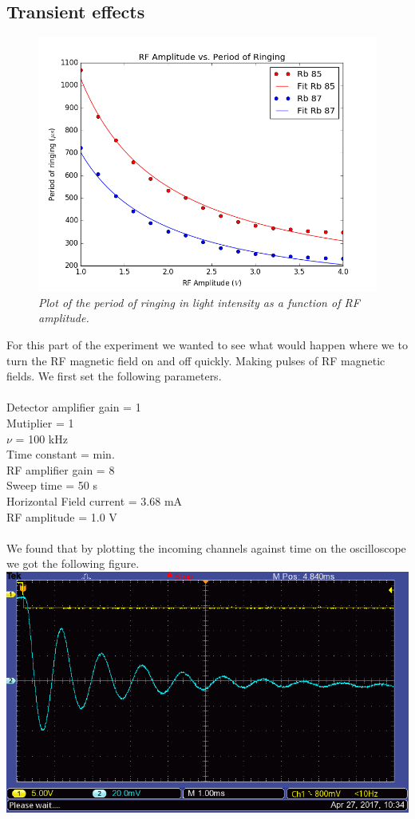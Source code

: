 \documentclass[twocolumn]{article}
\begin{document}
\subsection{Transient effects}
\begin{figure}
\begin{minipage}[t]{\textwidth}
\center
\includegraphics[width=0.45\linewidth]{pictures/per-rf.png}
\caption{\textit{Plot of the period of ringing in light intensity as a function 
of RF amplitude.}}
\label{fig:32}
\end{minipage}
\end{figure}
For this part of the experiment we wanted to see what would happen where we to 
turn the RF magnetic field on and off quickly. Making pulses of RF magnetic 
fields. We first set the following parameters.
\\
\\
Detector amplifier gain = 1 \\
Mutiplier = 1 \\
$\nu$ = 100 kHz \\
Time constant = min. \\
RF amplifier gain = 8 \\
Sweep time = 50 s \\
Horizontal Field current = 3.68 mA \\
RF amplitude = 1.0 V \\
\\
We found that by plotting the incoming channels against time on the 
oscilloscope we got the following figure.
\center
\includegraphics[width=\linewidth]{pictures/resonance-stuff.png}
\end{document}
